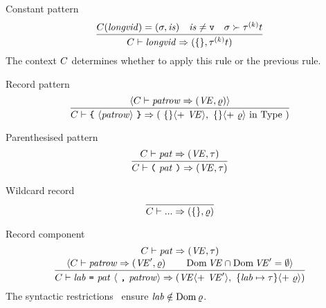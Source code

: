 \begin{sml-rule}{Constant pattern}
\begin{equation}\label{rule:static-core:constant-pattern}
  \vcenter{\infer{\C\ts\longvid\ra (\emptymap,\tauk\t)}
    {\C(\longvid)=(\sigma,\is)
      & \is\neq\isv
      & \sigma\succ\tauk\t}}
\end{equation}
The context $C$ determines whether to apply this rule or the previous rule.
\end{sml-rule}

\begin{sml-rule}{Record pattern}
\begin{equation}\label{rule:static-core:record-pattern}
  \vcenter{\infer{\C\ts\lttbrace\ \recpat\ \rttbrace\ra(\ \emptymap\optional{ +\ \VE},\ \emptymap
      \optional{ +\ \varrho}\ \In\ \Type\ )}
    {\optional{\C\ts\labpats\ra(\VE,\varrho)}}}
\end{equation}
\end{sml-rule}

\begin{sml-rule}{Parenthesised pattern}
\begin{equation}\label{rule:static-core:paren-pattern}
  \vcenter{\infer{\C\ts\parpat\ra(\VE,\tau)}
    {\C\ts\pat\ra(\VE,\tau)}}
\end{equation}
\end{sml-rule}


\begin{sml-rule}{Wildcard record}
\begin{equation}\label{rule:static-core:wildcard-record}
\vcenter{\infer{\C\ts\wildcardrow\ra(\emptymap,\varrho)}{}}
\end{equation}
\end{sml-rule}

\begin{sml-rule}{Record component}
\begin{equation}\label{rule:static-core:record-component}
  \vcenter{\infer{\C\ts\longlabpats\ra
     (\VE\optional{ +\ \VE'\rangle,\ \{\lab\mapsto\tau\}\langle +\ \varrho})}
    {\deduce{\optional{\C\ts\labpats\ra(\VE',\varrho)\qquad\Dom\VE\cap\Dom\VE' = \emptyset}}
      {\C\ts\pat\ra(\VE,\tau)}}}
\end{equation}
The syntactic restrictions~ ensure $\textit{lab\/}\notin\mathop{\rm Dom}\nolimits\varrho$.
\end{sml-rule}

